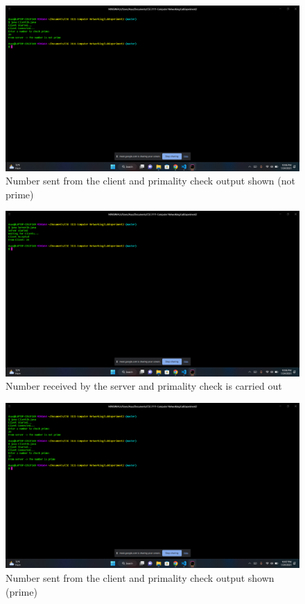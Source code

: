 \documentclass[11pt]{article}
\begin{document}
\begin{figure}[!h]
\centering
\includegraphics[width=\textwidth]{113.png}
\caption{Number sent from the client and primality check output shown (not prime)}
\end{figure}

\begin{figure}[!h]
\centering
\includegraphics[width=\textwidth]{114.png}
\caption{Number received by the server and primality check is carried out}
\end{figure}

\newpage

\begin{figure}[!h]
\centering
\includegraphics[width=\textwidth]{115.png}
\caption{Number sent from the client and primality check output shown (prime)}
\end{figure}
\end{document}
